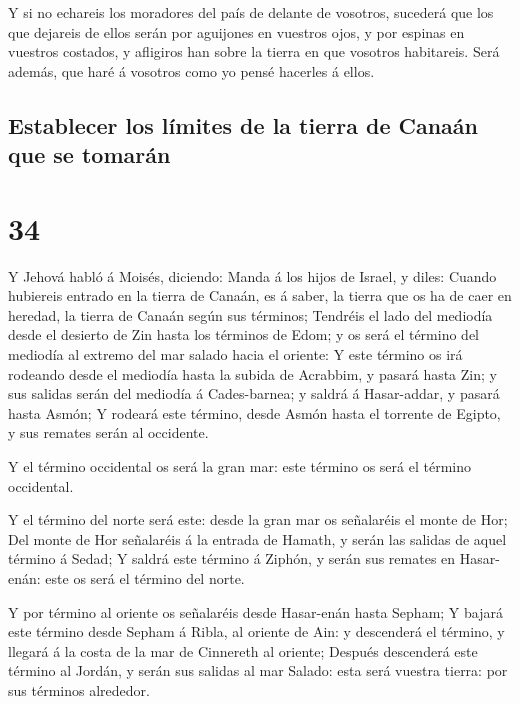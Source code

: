  Y si no echareis los moradores del país de delante de
vosotros, sucederá que los que dejareis de ellos serán por aguijones en
vuestros ojos, y por espinas en vuestros costados, y afligiros han sobre
la tierra en que vosotros habitareis.  Será además, que
haré á vosotros como yo pensé hacerles á ellos.

\hypertarget{establecer-los-luxedmites-de-la-tierra-de-canauxe1n-que-se-tomaruxe1n}{%
\subsection{Establecer los límites de la tierra de Canaán que se
tomarán}\label{establecer-los-luxedmites-de-la-tierra-de-canauxe1n-que-se-tomaruxe1n}}

\hypertarget{section-04-34}{%
\section{34}\label{section-04-34}}

 Y Jehová habló á Moisés, diciendo:  Manda á
los hijos de Israel, y diles: Cuando hubiereis entrado en la tierra de
Canaán, es á saber, la tierra que os ha de caer en heredad, la tierra de
Canaán según sus términos;  Tendréis el lado del mediodía
desde el desierto de Zin hasta los términos de Edom; y os será el
término del mediodía al extremo del mar salado hacia el oriente:
 Y este término os irá rodeando desde el mediodía hasta la
subida de Acrabbim, y pasará hasta Zin; y sus salidas serán del mediodía
á Cades-barnea; y saldrá á Hasar-addar, y pasará hasta Asmón;
 Y rodeará este término, desde Asmón hasta el torrente de
Egipto, y sus remates serán al occidente.

 Y el término occidental os será la gran mar: este término
os será el término occidental.

 Y el término del norte será este: desde la gran mar os
señalaréis el monte de Hor;  Del monte de Hor señalaréis á
la entrada de Hamath, y serán las salidas de aquel término á Sedad;
 Y saldrá este término á Ziphón, y serán sus remates en
Hasar-enán: este os será el término del norte.

 Y por término al oriente os señalaréis desde Hasar-enán
hasta Sepham;  Y bajará este término desde Sepham á
Ribla, al oriente de Ain: y descenderá el término, y llegará á la costa
de la mar de Cinnereth al oriente;  Después descenderá
este término al Jordán, y serán sus salidas al mar Salado: esta será
vuestra tierra: por sus términos alrededor.

